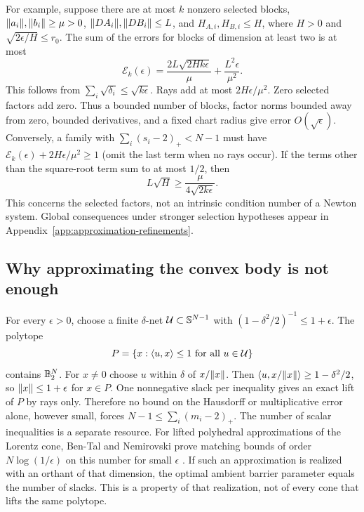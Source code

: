 For example, suppose there are at most $k$ nonzero selected blocks,
$\lVert a_i\rVert,\lVert b_i\rVert\geq\mu>0$,
$\lVert DA_i\rVert,\lVert DB_i\rVert\leq L$, and $H_{A,i},H_{B,i}\leq H$,
where $H>0$ and $\sqrt{2\epsilon/H}\leq r_0$. The sum of the errors
for blocks of dimension at least two is at most
\begin{equation}\label{eq:uniform-smooth-error}
 \mathcal E_k(\epsilon)
 =\frac{2L\sqrt{2Hk\epsilon}}{\mu}
       +\frac{L^2\epsilon}{\mu^2}.
\end{equation}
This follows from $\sum_i\sqrt{\delta_i}\leq\sqrt{k\epsilon}$.
Rays add at most $2H\epsilon/\mu^2$. Zero selected factors add zero.
Thus a bounded number of blocks, factor norms bounded away from zero,
bounded derivatives, and a fixed chart radius give error
$O(\sqrt\epsilon)$. Conversely, a family with
$\sum_i(s_i-2)_+<N-1$ must have
$\mathcal E_k(\epsilon)+2H\epsilon/\mu^2\geq1$ (omit the last term
when no rays occur). If the terms other than the square-root term sum
to at most $1/2$, then
\[
 L\sqrt H\geq\frac{\mu}{4\sqrt{2k\epsilon}}.
\]
This concerns the selected factors, not an intrinsic condition number
of a Newton system. Global consequences under stronger selection
hypotheses appear in Appendix~\ref{app:approximation-refinements}.

\subsection{Why approximating the convex body is not enough}
For every $\epsilon>0$, choose a finite $\delta$-net
$\mathcal U\subset\mathbb S^{N-1}$ with
$(1-\delta^2/2)^{-1}\leq1+\epsilon$. The polytope
\[
 P=\{x:\langle u,x\rangle\leq1\text{ for all }u\in\mathcal U\}
\]
contains $\mathbb B_2^N$. For $x\ne0$ choose $u$ within $\delta$ of
$x/\lVert x\rVert$. Then $\langle u,x/\lVert x\rVert\rangle\geq1-\delta^2/2$, so
$\lVert x\rVert\leq1+\epsilon$ for $x\in P$. One nonnegative slack per
inequality gives an exact lift of $P$ by rays only. Therefore no
bound on the Hausdorff or multiplicative error alone, however small,
forces $N-1\leq\sum_i(m_i-2)_+$. The number of scalar inequalities is a separate
resource. For lifted polyhedral approximations of the Lorentz cone,
Ben-Tal and Nemirovski prove matching bounds of order
$N\log(1/\epsilon)$ on this number for small $\epsilon$
\cite[Theorem~1.1 and Proposition~3.1]{BTN2001}. If such an
approximation is realized with an orthant of that dimension, the optimal
ambient barrier parameter equals the number of slacks.
This is a property of that realization, not of every cone that lifts
the same polytope.


